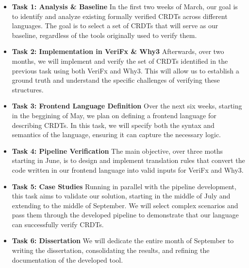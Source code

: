 \begin{itemize}
    \item \textbf{Task 1: Analysis \& Baseline} In the first two weeks of March, our goal is to identify and analyze existing formally verified CRDTs across different languages. The goal is to select a set of CRDTs that will serve as our baseline, regardless of the tools originally used to verify them.

    \item \textbf{Task 2: Implementation in VeriFx \& Why3} Afterwards, over two months, we will implement and verify the set of CRDTs identified in the previous task using both VeriFx and Why3. This will allow us to establish a ground truth and understand the specific challenges of verifying these structures.

    \item \textbf{Task 3: Frontend Language Definition} Over the next six weeks, starting in the beggining of May, we plan on defining a frontend language for describing CRDTs. In this task, we will specify both the syntax and semantics of the language, ensuring it can capture the necessary logic.

    \item \textbf{Task 4: Pipeline Verification} The main objective, over three moths starting in June, is to design and implement translation rules that convert the code written in our frontend language into valid inputs for VeriFx and Why3.

    \item \textbf{Task 5: Case Studies} Running in parallel with the pipeline development, this task aims to validate our solution, starting in the middle of July and extending to the middle of September. We will select complex scenarios and pass them through the developed pipeline to demonstrate that our language can successfully verify CRDTs.

    \item \textbf{Task 6: Dissertation} We will dedicate the entire month of September to writing the dissertation, consolidating the results, and refining the documentation of the developed tool.
\end{itemize}
